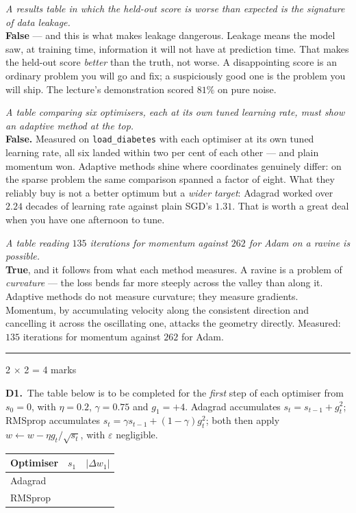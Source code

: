 \documentclass[10pt,a4paper]{article}
\newcommand{\parthead}[2]{\vspace{2pt}\noindent\rule{\linewidth}{0.4pt}\par\vspace{2pt}%
  \noindent{\bfseries Part #1}\hfill{\small #2}\par\vspace{1pt}}
\begin{document}
\begin{sC}

  \item \emph{A results table in which the held-out score is \emph{worse} than expected is the signature of data leakage.}\\[2pt] \textbf{False} --- and this is what makes leakage dangerous. Leakage means the model saw, at training time, information it will not have at prediction time. That makes the held-out score \emph{better} than the truth, not worse. A disappointing score is an ordinary problem you will go and fix; a suspiciously good one is the problem you will ship. The lecture's demonstration scored $81\%$ on pure noise.

  \item \emph{A table comparing six optimisers, each at its own tuned learning rate, must show an adaptive method at the top.}\\[2pt] \textbf{False.} Measured on \texttt{load\_diabetes} with each optimiser at its own tuned learning rate, all six landed within two per cent of each other --- and plain momentum won. Adaptive methods shine where coordinates genuinely differ: on the sparse problem the same comparison spanned a factor of eight. What they reliably buy is not a better optimum but a \emph{wider target}: Adagrad worked over $2.24$ decades of learning rate against plain SGD's $1.31$. That is worth a great deal when you have one afternoon to tune.

  \item \emph{A table reading $135$ iterations for momentum against $262$ for Adam on a ravine is possible.}\\[2pt] \textbf{True}, and it follows from what each method measures. A ravine is a problem of \emph{curvature} --- the loss bends far more steeply across the valley than along it. Adaptive methods do not measure curvature; they measure gradients. Momentum, by accumulating velocity along the consistent direction and cancelling it across the oscillating one, attacks the geometry directly. Measured: $135$ iterations for momentum against $262$ for Adam.

\end{sC}

\newpage

\parthead{D --- Short answer}{2 $\times$ 2 = 4 marks}

\textbf{D1.}\ The table below is to be completed for the \emph{first} step of each optimiser from $s_0 = 0$, with $\eta = 0.2$, $\gamma = 0.75$ and $g_1 = +4$. Adagrad accumulates $s_t = s_{t-1} + g_t^2$; RMSprop accumulates $s_t = \gamma s_{t-1} + (1-\gamma)g_t^2$; both then apply $w \leftarrow w - \eta g_t/\sqrt{s_t}$, with $\varepsilon$ negligible.\par\vspace{1mm}\hspace*{6mm}\begin{tabular}{@{}lll@{}}\hline\rule{0pt}{10pt}Optimiser & $s_1$ & $\lvert \Delta w_1 \rvert$\\[1pt]\hline\rule{0pt}{10pt}Adagrad & & \\ RMSprop & & \\[1pt]\hline\end{tabular}
\end{document}
